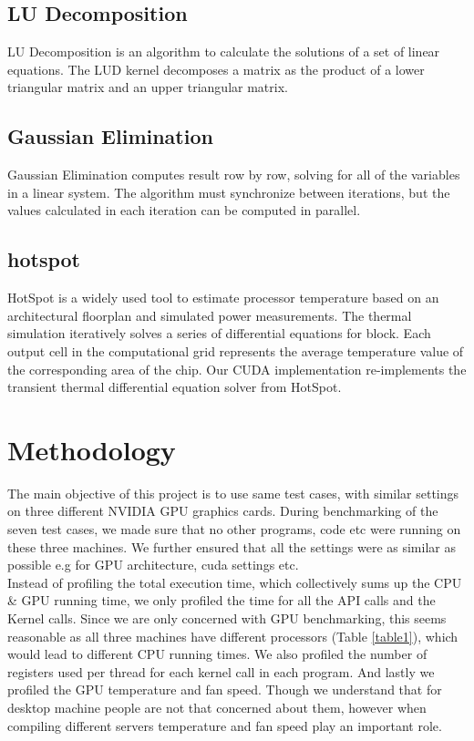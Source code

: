 \documentclass[paper=a4, fontsize=11pt]{scrartcl}
\numberwithin{equation}{section}		%
\numberwithin{figure}{section}			%
\numberwithin{table}{section}				%
\begin{document}
\subsection{LU Decomposition}
LU Decomposition is an algorithm to calculate the solutions of a set of linear equations. The LUD kernel decomposes a matrix as the product of a lower triangular matrix and an upper triangular matrix.

\subsection{Gaussian Elimination}
Gaussian Elimination computes result row by row, solving for all of the variables in a linear system. The algorithm must synchronize between iterations, but the values calculated in each iteration can be computed in parallel.

\subsection{hotspot}
HotSpot is a widely used tool to estimate processor temperature based on an architectural floorplan and simulated power measurements. The thermal simulation iteratively solves a series of differential equations for block. Each output cell in the computational grid represents the average temperature value of the corresponding area of the chip. Our CUDA implementation re-implements the transient thermal differential equation solver from HotSpot.






\newpage
\section{Methodology}
The main objective of this project is to use same test cases, with similar settings on three different NVIDIA GPU graphics cards. During benchmarking of the seven test cases, we made sure that no other programs, code etc were running on these three machines. We further ensured that all the settings were as similar as possible e.g for GPU architecture, cuda settings etc.\\


Instead of profiling the total execution time, which collectively sums up the CPU \& GPU running time, we only profiled the time for all the API calls and the Kernel calls. Since we are only concerned with GPU benchmarking, this seems reasonable as all three machines have different processors (Table \ref{table1}), which would lead to different CPU running times. We also profiled the number of registers used per thread for each kernel call in each program. And lastly we profiled the GPU temperature and fan speed. Though we understand that for desktop machine people are not that concerned about them, however when compiling different servers temperature and fan speed play an important role.  
\end{document}

